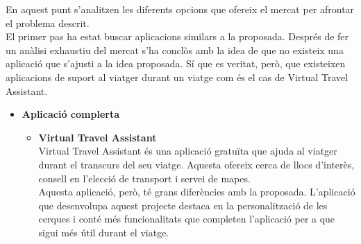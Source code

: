 En aquest punt s’analitzen les diferents opcions que ofereix el mercat per afrontar el problema descrit.\\
El primer pas ha estat buscar aplicacions similars a la proposada. Després de fer un anàlisi exhaustiu del mercat s’ha conclòs amb la idea de que no existeix una aplicació que s’ajusti a la idea proposada. Sí que es veritat, però, que existeixen aplicacions de suport al viatger durant un viatge com és el cas de Virtual Travel Assistant.
\begin{itemize}
\item{\textbf{Aplicació complerta}}
\begin{itemize}
\item{\textbf{Virtual Travel Assistant\\}}
Virtual Travel Assistant és una aplicació gratuïta que ajuda al viatger durant el transcurs del seu viatge. Aquesta ofereix cerca de llocs d’interès, consell en l’elecció de transport i servei de mapes.\\
Aquesta aplicació, però, té grans diferències amb la proposada. L’aplicació que desenvolupa aquest projecte destaca en la personalització de les cerques i conté més funcionalitats que completen l’aplicació per a que sigui més útil durant el viatge.\\
\end{itemize}


\end{itemize}
